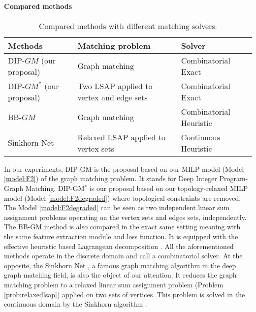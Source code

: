 \documentclass[times,onecolumn,final,authoryear]{article}
\theoremstyle{definition}
\begin{document}
\paragraph{Compared methods}

\begin{table}[]
    \centering
    \begin{tabular}{|p{2.5cm}||p{3.5cm}|p{2.5cm}|} 
    \hline
        Methods & Matching problem & Solver \\ \hline \hline
         DIP-$GM$ (our proposal)&  Graph matching & Combinatorial Exact\\ \hline
         DIP-$GM^*$ (our proposal)&  Two LSAP applied to vertex and edge sets& Combinatorial Exact \\ \hline
        BB-$GM$ \cite{BB-GM}&  Graph matching & Combinatorial Heuristic\\ \hline 
         Sinkhorn Net \cite{SinkhornNet}&  Relaxed LSAP applied to vertex sets& Continuous  Heuristic\\ \hline
    \end{tabular}
    \caption{Compared methods with different matching solvers.}
    \label{tab:comparedmethods}
\end{table}
In our experiments, DIP-GM is the proposal based on our MILP model (Model \ref{model:F2}) of the graph matching problem. It stands for Deep Integer Program-Graph Matching. DIP-GM$^*$ is our proposal based on our topology-relaxed MILP model (Model \ref{model:F2degraded}) where topological constraints are removed. The Model \ref{model:F2degraded} can be seen as two independent linear sum assignment problems operating on the vertex sets and edges sets, independently. The BB-GM \cite{BB-GM} method is also compared in the exact same setting meaning with the same feature extraction module and loss function. It is equipped with the effective heuristic based Lagrangean decomposition \cite{DBLP:journals/corr/SwobodaRAKS16}. All the aforementioned methods operate in the discrete domain and call a combinatorial solver.
At the opposite, the Sinkhorn Net \cite{SinkhornNet}, a famous graph matching algorithm in the deep graph matching field, is also the object of our attention. It reduces the graph matching problem to a relaxed linear sum assignment problem (Problem \ref{prob:relaxedlsap}) applied on two sets of vertices. This problem is solved in the continuous domain by the Sinkhorn algorithm \cite{SinkhornAlgo}. 
\end{document}
